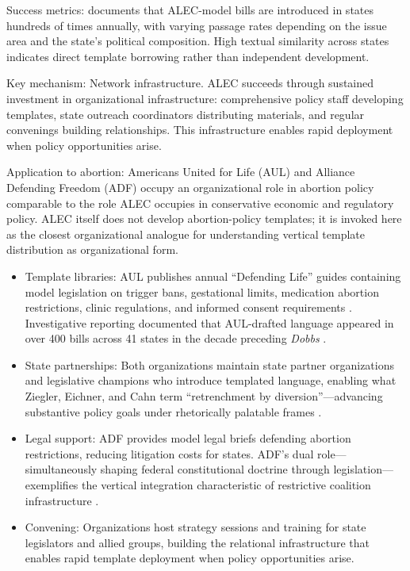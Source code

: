 Success metrics: \textcite{hertel-fernandezStateCapture2019} documents that ALEC-model bills are introduced in states hundreds of times annually, with varying passage rates depending on the issue area and the state's political composition. High textual similarity across states indicates direct template borrowing rather than independent development.

Key mechanism: Network infrastructure. ALEC succeeds through sustained investment in organizational infrastructure: comprehensive policy staff developing templates, state outreach coordinators distributing materials, and regular convenings building relationships. This infrastructure enables rapid deployment when policy opportunities arise.

Application to abortion: Americans United for Life (AUL) and Alliance Defending Freedom (ADF) occupy an organizational role in abortion policy comparable to the role ALEC occupies in conservative economic and regulatory policy. ALEC itself does not develop abortion-policy templates; it is invoked here as the closest organizational analogue for understanding vertical template distribution as organizational form.

\begin{itemize}
\item Template libraries: AUL publishes annual ``Defending Life'' guides containing model legislation on trigger bans, gestational limits, medication abortion restrictions, clinic regulations, and informed consent requirements \parencite{sheppardWhamBamSonogram2012, robertsSurprisedAllThese2019}. Investigative reporting documented that AUL-drafted language appeared in over 400 bills across 41 states in the decade preceding \textit{Dobbs} \parencite{beckerThisAntiabortionGroup2022}.
\item State partnerships: Both organizations maintain state partner organizations and legislative champions who introduce templated language, enabling what Ziegler, Eichner, and Cahn term ``retrenchment by diversion''---advancing substantive policy goals under rhetorically palatable frames \parencite{zieglerRETRENCHMENTDIVISIONNEW2025}.
\item Legal support: ADF provides model legal briefs defending abortion restrictions, reducing litigation costs for states. ADF's dual role---simultaneously shaping federal constitutional doctrine through legislation---exemplifies the vertical integration characteristic of restrictive coalition infrastructure \parencite{kirkpatrickGroupThatOverturned2023}.
\item Convening: Organizations host strategy sessions and training for state legislators and allied groups, building the relational infrastructure that enables rapid template deployment when policy opportunities arise.
\end{itemize}

